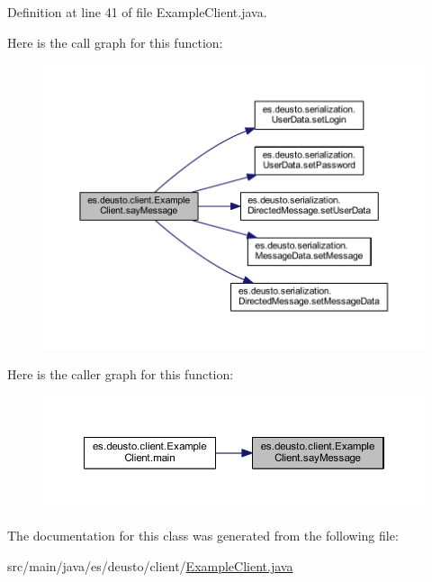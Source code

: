 Definition at line 41 of file Example\+Client.\+java.

Here is the call graph for this function\+:
\nopagebreak
\begin{figure}[H]
\begin{center}
\leavevmode
\includegraphics[width=350pt]{classes_1_1deusto_1_1client_1_1_example_client_a5bd90c0a118b8f1103cec4316aef33ef_cgraph}
\end{center}
\end{figure}
Here is the caller graph for this function\+:
\nopagebreak
\begin{figure}[H]
\begin{center}
\leavevmode
\includegraphics[width=350pt]{classes_1_1deusto_1_1client_1_1_example_client_a5bd90c0a118b8f1103cec4316aef33ef_icgraph}
\end{center}
\end{figure}


The documentation for this class was generated from the following file\+:\begin{DoxyCompactItemize}
\item 
src/main/java/es/deusto/client/\mbox{\hyperlink{_example_client_8java}{Example\+Client.\+java}}\end{DoxyCompactItemize}
